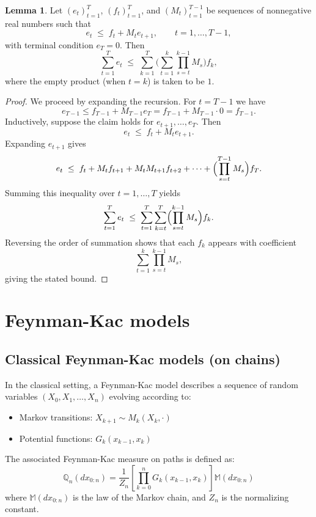 \documentclass[11pt,reqno]{amsart}
\theoremstyle{definition}
\newtheorem{lem}[thm]{Lemma}
\begin{document}
\begin{lem}\label{lem:gronwalltype}
Let $(e_t)_{t=1}^T$, $(f_t)_{t=1}^T$, and $(M_t)_{t=1}^{T-1}$ be sequences of nonnegative real numbers such that
\[
e_t \;\le\; f_t + M_t e_{t+1}, \qquad t=1,\dots,T-1,
\]
with terminal condition $e_T = 0$. Then
\[
\sum_{t=1}^T e_t 
\;\le\; \sum_{k=1}^T \Biggl( \sum_{t=1}^k \prod_{s=t}^{k-1} M_s \Biggr) f_k,
\]
where the empty product (when $t=k$) is taken to be $1$.
\end{lem}

\begin{proof}
We proceed by expanding the recursion. For $t = T-1$ we have
\[
e_{T-1} \le f_{T-1} + M_{T-1} e_T = f_{T-1} + M_{T-1}\cdot 0 = f_{T-1}.
\]
Inductively, suppose the claim holds for $e_{t+1},\dots,e_T$. Then
\[
e_t \;\le\; f_t + M_t e_{t+1}.
\]
Expanding $e_{t+1}$ gives
\[
e_t \;\le\; f_t + M_t f_{t+1} + M_t M_{t+1} f_{t+2} + \cdots + \Bigl(\prod_{s=t}^{T-1} M_s\Bigr) f_T.
\]
Summing this inequality over $t=1,\dots,T$ yields
\[
\sum_{t=1}^T e_t \;\le\; \sum_{t=1}^T \sum_{k=t}^T 
\Bigl(\prod_{s=t}^{k-1} M_s\Bigr) f_k.
\]
Reversing the order of summation shows that each $f_k$ appears with coefficient
\[
\sum_{t=1}^k \prod_{s=t}^{k-1} M_s,
\]
giving the stated bound.
\end{proof}



\section{Feynman-Kac models}
\subsection{Classical Feynman-Kac models (on chains)}

In the classical setting, a Feynman-Kac model describes a sequence of random variables \((X_0, X_1, \dots, X_n)\) evolving according to:

\begin{itemize}
  \item Markov transitions: \(X_{k+1} \sim M_k(X_k, \cdot)\)
  \item Potential functions: \(G_k(x_{k-1},x_k)\)
\end{itemize}

The associated Feynman-Kac measure on paths is defined as:
\[
\mathbb{Q}_n(dx_{0:n}) = \frac{1}{Z_n} \left[ \prod_{k=0}^n G_k(x_{k-1},x_k) \right] \mathbb{M}(dx_{0:n})
\]
where \(\mathbb{M}(dx_{0:n})\) is the law of the Markov chain, and \(Z_n\) is the normalizing constant.
\end{document}
